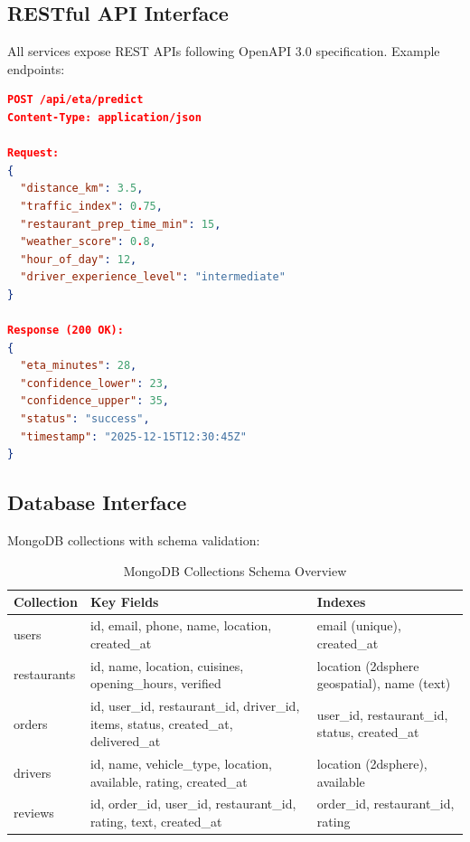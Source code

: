 \documentclass[12pt,a4paper]{report}
\begin{document}
\begin{itemize}
\subsection{RESTful API Interface}

All services expose REST APIs following OpenAPI 3.0 specification. Example endpoints:

\begin{lstlisting}[language=json, caption={ETA Prediction API Specification}]
POST /api/eta/predict
Content-Type: application/json

Request:
{
  "distance_km": 3.5,
  "traffic_index": 0.75,
  "restaurant_prep_time_min": 15,
  "weather_score": 0.8,
  "hour_of_day": 12,
  "driver_experience_level": "intermediate"
}

Response (200 OK):
{
  "eta_minutes": 28,
  "confidence_lower": 23,
  "confidence_upper": 35,
  "status": "success",
  "timestamp": "2025-12-15T12:30:45Z"
}
\end{lstlisting}

\subsection{Database Interface}

MongoDB collections with schema validation:

\begin{table}[H]
\centering
\caption{MongoDB Collections Schema Overview}
\begin{tabular}{p{2cm} p{5cm} p{5cm}}
\toprule
\textbf{Collection} & \textbf{Key Fields} & \textbf{Indexes} \\
\midrule
users & id, email, phone, name, location, created\_at & email (unique), created\_at \\
restaurants & id, name, location, cuisines, opening\_hours, verified & location (2dsphere geospatial), name (text) \\
orders & id, user\_id, restaurant\_id, driver\_id, items, status, created\_at, delivered\_at & user\_id, restaurant\_id, status, created\_at \\
drivers & id, name, vehicle\_type, location, available, rating, created\_at & location (2dsphere), available \\
reviews & id, order\_id, user\_id, restaurant\_id, rating, text, created\_at & order\_id, restaurant\_id, rating \\
\bottomrule
\end{tabular}
\end{table}


\end{itemize}
\end{document}
